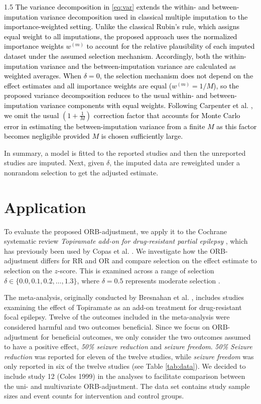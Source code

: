 \documentclass{article}
\newcommand{\mycolor}[1]{\textcolor{black}{#1}}
\begin{document}
\begin{spacing}{1.5}
\mycolor{The variance decomposition in \eqref{eq:var} extends the within- and between-imputation variance decomposition used in classical multiple imputation to the importance-weighted setting. Unlike the classical Rubin's rule, which assigns equal weight to all imputations, the proposed approach uses the normalized importance weights $w^{(m)}$ to account for the relative plausibility of each imputed dataset under the assumed selection mechanism. Accordingly, both the within-imputation variance and the between-imputation variance are calculated as weighted averages. When $\delta = 0$, the selection mechanism does not depend on the effect estimates and all importance weights are equal ($w^{(m)} = 1/M$), so the proposed variance decomposition reduces to the usual within- and between-imputation variance components with equal weights. Following Carpenter et al. \cite{carpenter2011assessing}, we omit the usual $(1+\frac{1}{M})$ correction factor that accounts for Monte Carlo error in estimating the between-imputation variance from a finite $M$ as this factor becomes negligible provided $M$ is chosen sufficiently large.}

In summary, a model is fitted to the reported studies and then the unreported studies are imputed. Next, given $\delta$, the imputed data are reweighted under a nonrandom selection to get the adjusted estimate. 

\section{Application}
\label{application}

To evaluate the proposed ORB-adjustment, we apply it to the Cochrane systematic review \textit{Topiramate add-on for drug-resistant partial epilepsy} \cite{pulman2014topiramate}, which has previously been used by Copas et al. \cite{copas2019model}. We investigate how the ORB-adjustment differs for RR and OR and compare selection on the effect estimate to selection on the $z$-score. This is examined across a range of selection $\delta \in \{0.0, 0.1, 0.2, \ldots, 1.3\}$, where $\delta = 0.5$ represents moderate selection \cite{carpenter2011assessing}. 

The meta-analysis, originally conducted by Bresnahan et al. \cite{bresnahan2019topiramate}, includes studies examining the effect of Topiramate as an add-on treatment for drug-resistant focal epilepsy.  Twelve of the outcomes included in the meta-analysis were considered harmful and two outcomes beneficial. Since we focus on ORB-adjustment for beneficial outcomes, we only consider the two outcomes assumed to have a positive effect, \ie \textit{50\% seizure reduction} and \textit{seizure freedom}. \textit{50\% Seizure reduction} was reported for eleven of the twelve studies, while \textit{seizure freedom} was only reported in six of the twelve studies (see Table \ref{tab:data}). We decided to include study 12 (Coles 1999) in the analyses to facilitate comparison between the uni- and multivariate ORB-adjustment. The data set contains study sample sizes and event counts for intervention and control groups. 


\end{spacing}
\end{document}
